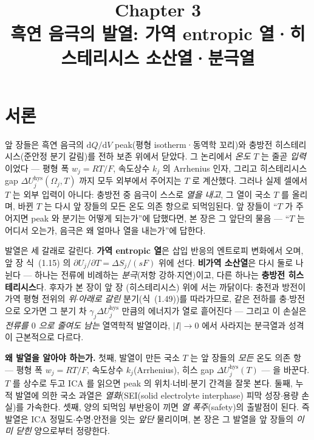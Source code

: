 \documentclass[11pt,a4paper]{article}
\title{\textbf{\LARGE Chapter 3}\\[0.35em]\Large 흑연 음극의 발열: 가역 entropic 열·히스테리시스 소산열·분극열}
\author{}
\date{}
\newcommand{\dd}{\mathrm{d}}
\newcommand{\hys}{\mathrm{hys}}
\begin{document}
\maketitle

\section*{서론}
앞 장들은 흑연 음극의 $\dd Q/\dd V$ peak(평형 isotherm·동역학 꼬리)와 충방전 히스테리시스(준안정 분기 갈림)를
전하 보존 위에서 닫았다. 그 논리에서 \emph{온도} $T$ 는 줄곧 \emph{입력}이었다 — 평형 폭 $w_j=RT/F$, 속도상수
$k_j$ 의 Arrhenius 인자, 그리고 히스테리시스 gap $\Delta U_j^\hys(\Omega_j,T)$ 까지 모두 외부에서 주어지는 $T$ 로
계산했다. 그러나 실제 셀에서 $T$ 는 외부 입력이 아니다: 충방전 중 음극이 스스로 \emph{열을 내고}, 그 열이 국소
$T$ 를 올리며, 바뀐 $T$ 는 다시 앞 장들의 모든 온도 의존 항으로 되먹임된다. 앞 장들이 ``$T$ 가 주어지면 peak 와
분기는 어떻게 되는가''에 답했다면, 본 장은 그 앞단의 물음 — ``$T$ 는 어디서 오는가, 음극은 왜 얼마나 열을
내는가''에 답한다.

발열은 세 갈래로 갈린다. \textbf{가역 entropic 열}은 삽입 반응의 엔트로피 변화에서 오며, 앞 장 식~(1.15) 의
$\partial U_j/\partial T=\Delta S_j/(sF)$ 위에 선다. \textbf{비가역 소산열}은 다시 둘로 나뉜다 — 하나는 전류에
비례하는 \emph{분극}(저항 강하$\cdot$지연)이고, 다른 하나는 \textbf{충방전 히스테리시스}다. 후자가 본 장이 앞 장
(히스테리시스) 위에 서는 까닭이다: 충전과 방전이 가역 평형 전위의 \emph{위$\cdot$아래로 갈린} 분기(식~(1.49))를
따라가므로, 같은 전하를 충$\cdot$방전으로 오가면 그 분기 차 $\gamma_j\Delta U_j^\hys$ 만큼의 에너지가 열로
흩어진다 — 그리고 이 손실은 \emph{전류를 $0$ 으로 줄여도 남는} 열역학적 발열이라, $|I|\to0$ 에서 사라지는 분극열과
성격이 근본적으로 다르다.

\textbf{왜 발열을 알아야 하는가.} 첫째, 발열이 만든 국소 $T$ 는 앞 장들의 \emph{모든} 온도 의존 항 — 평형 폭
$w_j=RT/F$, 속도상수 $k_j$(Arrhenius), 히스 gap $\Delta U_j^\hys(T)$ — 을 바꾼다. $T$ 를 상수로 두고 ICA 를
읽으면 peak 의 위치$\cdot$너비$\cdot$분기 간격을 잘못 본다. 둘째, 누적 발열에 의한 국소 과열은 \emph{열화}(SEI(solid electrolyte interphase) 피막 성장$\cdot$용량 손실)를 가속한다. 셋째, 양의 되먹임 부반응이 끼면 \emph{열 폭주}(safety)의 출발점이 된다. 즉
발열은 ICA 정밀도$\cdot$수명$\cdot$안전을 잇는 \emph{앞단} 물리이며, 본 장은 그 발열을 앞 장들의 \emph{이미 닫힌}
양으로부터 정량한다.
\end{document}
